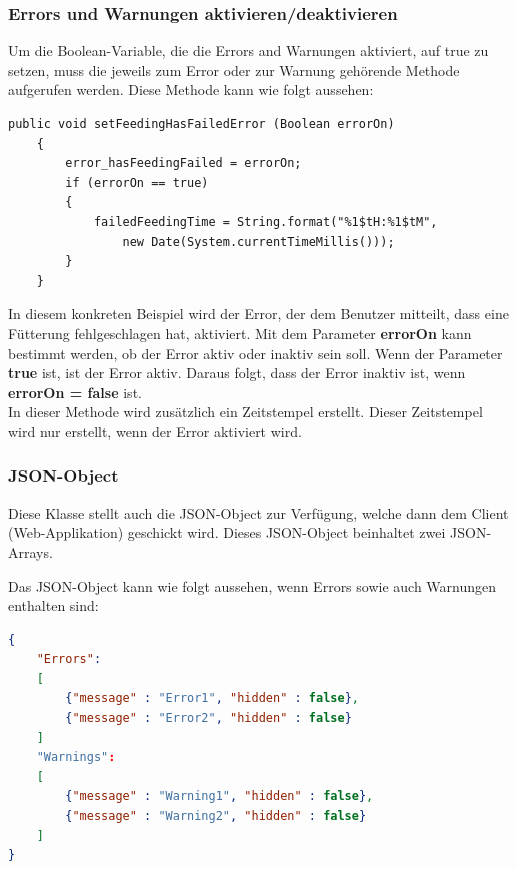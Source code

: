 \subsubsection{Errors und Warnungen aktivieren/deaktivieren}
Um die Boolean-Variable, die die Errors and Warnungen aktiviert, auf true zu setzen, muss die jeweils zum Error oder zur Warnung gehörende Methode aufgerufen werden. Diese Methode kann wie folgt aussehen:
\begin{lstlisting}[style=JavaStyle, caption=Error setzen]
public void setFeedingHasFailedError (Boolean errorOn)
    {
        error_hasFeedingFailed = errorOn;
        if (errorOn == true)
        {
            failedFeedingTime = String.format("%1$tH:%1$tM", 
            	new Date(System.currentTimeMillis()));
        }   
    }
\end{lstlisting}
In diesem konkreten Beispiel wird der Error, der dem Benutzer mitteilt, dass eine Fütterung fehlgeschlagen hat, aktiviert. Mit dem Parameter \textbf{errorOn} kann bestimmt werden, ob der Error aktiv oder inaktiv sein soll. Wenn der Parameter \textbf{true} ist, ist der Error aktiv. Daraus folgt, dass der Error inaktiv ist, wenn \textbf{errorOn = false} ist. 
\\ In dieser Methode wird zusätzlich ein Zeitstempel erstellt. Dieser Zeitstempel wird nur erstellt, wenn der Error aktiviert wird. 

\subsubsection{JSON-Object} \label{subsubsec:Array}
Diese Klasse stellt auch die \ac{JSON}-Object zur Verfügung, welche dann dem Client (Web-Applikation) geschickt wird. Dieses \ac{JSON}-Object beinhaltet zwei \ac{JSON}-Arrays.

Das \ac{JSON}-Object kann wie folgt aussehen, wenn Errors sowie auch Warnungen enthalten sind:

\begin{lstlisting}[language=json,firstnumber=1, caption=\ac{JSON}-Objekt mit Errors und Warnungen]
{ 
	"Errors": 
	[ 
		{"message" : "Error1", "hidden" : false}, 
		{"message" : "Error2", "hidden" : false} 
	] 
	"Warnings": 
	[ 
		{"message" : "Warning1", "hidden" : false}, 
		{"message" : "Warning2", "hidden" : false} 
	] 
} 
\end{lstlisting}

